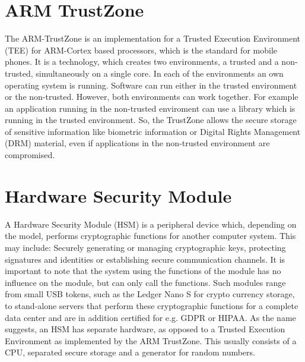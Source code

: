 \documentclass[12pt,oneside,a4paper,parskip]{scrbook}
\begin{document}

\newpage
\section{ARM TrustZone}
\label{arm:TrustZone}

The ARM-TrustZone is an implementation for a Trusted Execution Environment (TEE) for ARM-Cortex based processors, which is the standard for mobile phones. It is a technology, which creates two environments, a trusted and a non-trusted, simultaneously on a single core. In each of the environments an own operating system is running. Software can run either in the trusted environment or the non-trusted. However, both environments can work together. For example an application running in the non-trusted enviroment can use a library which is running in the trusted environment. So, the TrustZone allows the secure storage of sensitive information like biometric information or Digital Rights Management (DRM) material, even if applications in the non-trusted environment are compromised.
\parencite{fowler_trustzone_2017}

\section{Hardware Security Module}
\label{sec:HSM}

A Hardware Security Module (HSM) is a peripheral device which, depending on the model, performs cryptographic functions for another computer system. This may include: Securely generating or managing cryptographic keys, protecting signatures and identities or establishing secure communication channels. It is important to note that the system using the functions of the module has no influence on the module, but can only call the functions. Such modules range from small USB tokens, such as the Ledger Nano S for crypto currency storage, to stand-alone servers that perform these cryptographic functions for a complete data center and are in addition certified for e.g. GDPR or HIPAA. As the name suggests, an HSM has separate hardware, as opposed to a Trusted Execution Environment as implemented by the ARM TrustZone. This usually consists of a CPU, separated secure storage and a generator for random numbers.
\parencite{sustek_hardware_2011}
\end{document}
